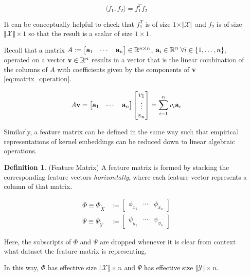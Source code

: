 \documentclass[twoside]{article} \usepackage{aistats2017}
\theoremstyle{definition}
\newtheorem{definition}[theorem]{Definition}
\newcommand{\ds}[1]{\tilde{#1}}
\newcommand{\inner}[2]{{\langle #1, #2 \rangle}}
\newcommand{\cardX}{\Vert \mathcal{X} \Vert}
\newcommand{\cardY}{\Vert \mathcal{Y} \Vert}
\begin{document}
		\begin{equation}
			\inner{f_{1}}{f_{2}} = f_{1}^{T} f_{2}
		\label{eq:inner_dot_notation}
		\end{equation}
		
		It can be conceptually helpful to check that $f_{1}^{T}$ is of size $1 \times \cardX$ and $f_{2}$ is of size $\cardX \times 1$ so that the result is a scalar of size $1 \times 1$.

		Recall that a matrix $A := \begin{bmatrix} \mathbf{a}_{1} & \cdots & \mathbf{a}_{n} \end{bmatrix} \in \mathbb{R}^{n \times n}$, $\mathbf{a}_{i} \in \mathbb{R}^{n} \; \forall i \in \{1, \dots, n\}$, operated on a vector $\mathbf{v} \in \mathbb{R}^{n}$ results in a vector that is the linear combination of the columns of $A$ with coefficients given by the components of $\mathbf{v}$ \eqref{eq:matrix_operation}.
		
		\begin{equation}
			A \mathbf{v} = \begin{bmatrix} \mathbf{a}_{1} & \cdots & \mathbf{a}_{n} \end{bmatrix} \begin{bmatrix} v_{1} \\ \vdots \\ v_{n} \end{bmatrix} = \sum_{i = 1}^{n} v_{i} \mathbf{a}_{i}
		\label{eq:matrix_operation}
		\end{equation}
		
		Similarly, a feature matrix can be defined in the same way such that empirical representations of kernel embeddings can be reduced down to linear algebraic operations.
		
		\begin{definition} \label{def:feature_matrix}
			(Feature Matrix)
			A feature matrix is formed by stacking the corresponding feature vectors \textit{horizontally}, where each feature vector represents a column of that matrix.
			
			\begin{equation}
			\begin{aligned}
				\Phi \equiv \Phi_{\ds{X}} &:= \begin{bmatrix} \phi_{x_{1}} & \cdots & \phi_{x_{n}} \end{bmatrix} \\
				\Psi \equiv \Psi_{\ds{Y}} &:= \begin{bmatrix} \psi_{y_{1}} & \cdots & \psi_{y_{n}} \end{bmatrix}
			\label{eq:feature_matrix}
			\end{aligned}
			\end{equation}
			
			Here, the subscripts of $\Phi$ and $\Psi$ are dropped whenever it is clear from context what dataset the feature matrix is representing.
			
			In this way, $\Phi$ has effective size $\cardX \times n$ and $\Psi$ has effective size $\cardY \times n$.			
		\end{definition} 
		
\end{document}
